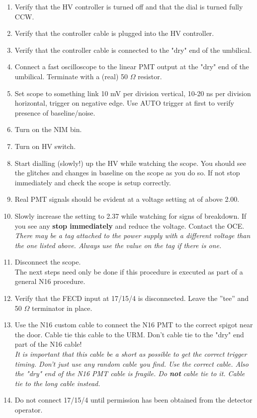 \begin{enumerate}
\item \CheckBox[name=n16pmt1]{} Verify that the HV controller is turned off and that the dial is turned fully CCW.
\item \CheckBox[name=n16pmt2]{} Verify that the controller cable is plugged into the HV controller.
\item \CheckBox[name=n16pmt3]{} Verify that the controller cable is connected to the "dry" end of the umbilical.
\item \CheckBox[name=n16pmt4]{} Connect a fast oscilloscope to the linear PMT output at the "dry" end of the umbilical. Terminate with a (real) 50 $\Omega$ resistor.
\item \CheckBox[name=n16pmt5]{} Set scope to something link 10 mV per division vertical, 10-20 ns per division horizontal, trigger on negative edge. Use AUTO trigger at first to verify presence of baseline/noise.
\item \CheckBox[name=n16pmt6]{} Turn on the NIM bin.
\item \CheckBox[name=n16pmt7]{} Turn on HV switch.
\item \CheckBox[name=n16pmt8]{} Start dialling (slowly!) up the HV while watching the scope. You should see the glitches and changes in baseline on the scope as you do so. If not stop immediately and check the scope is setup correctly.
\item \CheckBox[name=n16pmt9]{} Real PMT signals should be evident at a voltage setting at of above 2.00.
\item \CheckBox[name=n16pmt10]{} Slowly increase the setting to 2.37 while watching for signs of breakdown. If you see any {\bf stop immediately} and reduce the voltage. Contact the OCE. {\it There may be a tag attached to the power supply with a different voltage than the one listed above. Always use the value on the tag if there is one.}
\item \CheckBox[name=n16pmt11]{} Disconnect the scope.\\ The next steps need only be done if this procedure is executed as part of a general N16 procedure.
\item \CheckBox[name=n16pmt12]{} Verify that the FECD input at 17/15/4
  is disconnected. Leave the ''tee'' and 50 $\Omega$ terminator in place.
\item \CheckBox[name=n16pmt13]{} Use the N16 custom cable to connect the N16 PMT to the correct spigot near the door. Cable tie this cable to the URM. Don't cable tie to the "dry" end part of the N16 cable! \\ {\it It is important that this cable be a short as possible to get the correct trigger timing. Don't just use any random cable you find. Use the correct cable. Also the "dry" end of the N16 PMT cable is fragile. Do {\bf not} cable tie to it. Cable tie to the long cable instead.}
\item \CheckBox[name=n16pmt14]{} Do not connect 17/15/4 until permission has been obtained from the detector operator.
\end{enumerate}

